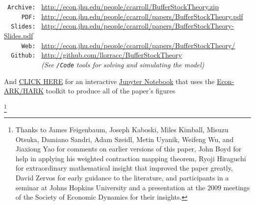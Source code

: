 \documentclass[titlepage]{\econtex}\providecommand{\texname}{BufferStockTheory}%
\begin{document}
\begin{small}
\parbox{\textwidth}{
\begin{center}
\begin{tabbing}
\texttt{~Archive:~} \= \= \url{http://econ.jhu.edu/people/ccarroll/BufferStockTheory.zip} \kill \\  %
\texttt{~~~~~PDF:~} \> \> \url{http://econ.jhu.edu/people/ccarroll/papers/BufferStockTheory.pdf} \\
\texttt{~~Slides:~} \> \> \url{http://econ.jhu.edu/people/ccarroll/papers/BufferStockTheory-Slides.pdf} \\
\texttt{~~~~~Web:~} \> \> \url{http://econ.jhu.edu/people/ccarroll/papers/BufferStockTheory/}    \\
\texttt{~~Github:~} \> \> \url{http://github.com/llorracc/BufferStockTheory} \\
\texttt{~~~~~~~~~~} \> \> \textit{(See \texttt{/Code} tools for solving and simulating the model)} \\
\end{tabbing}
\end{center}
And \href{https://github.com/econ-ark/DemARK/tree/master/notebooks/BufferStockTheory.ipynb}{CLICK HERE} for an interactive \href{http:https://en.wikipedia.org/wiki/Project_Jupyter}{Jupyter Notebook} that uses the \href{https://econ-ark/HARK}{Econ-ARK/HARK} toolkit to produce all of the paper's figures
}
\end{small}

\begin{authorsinfo}
\end{authorsinfo}

\thanks{Thanks to James Feigenbaum, Joseph Kaboski, Miles
  Kimball, Misuzu Otsuka, Damiano Sandri, Adam Szeidl, Metin Uyanik, Weifeng Wu,
  and Jiaxiong Yao for comments on earlier versions of this paper, John Boyd for help
  in applying his weighted contraction mapping theorem, Ryoji
  Hiraguchi for extraordinary mathematical insight that improved the
  paper greatly, David Zervos for early guidance to the literature,
  and participants in a seminar at Johns Hopkins University and a
  presentation at the 2009 meetings of the Society of Economic
  Dynamics for their insights.}
\end{document}
